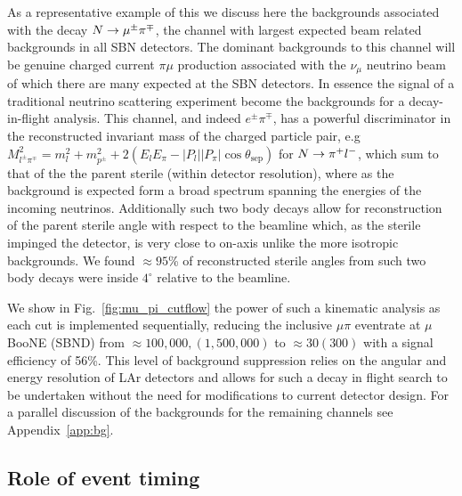 \documentclass[11pt, a4paper]{article}
\newcommand{\reffig}[1]{Fig.~\ref{#1}}
\newcommand{\refapp}[1]{Appendix~\ref{#1}}
\def\ster{\ensuremath N}
\begin{document}
As a representative example of this we discuss here the backgrounds associated
with the decay $\ster \rightarrow \mu^\pm \pi^\mp$, the channel with largest
expected beam related backgrounds in all SBN detectors. The dominant
backgrounds to this channel will be genuine charged current $\pi \mu$
production associated with the $\nu_\mu$ neutrino beam of which there are many
expected at the SBN detectors. In essence the signal of a traditional neutrino
scattering experiment become the backgrounds for a decay-in-flight analysis.
This channel, and indeed $e^\pm \pi^\mp$, has a powerful discriminator in the
reconstructed invariant mass of the charged particle pair, e.g  $M_{l^\pm
\pi^\mp}^2=m_l^2+m_{p^\pm}^2+ 2(E_l E_\pi - |P_l||P_\pi|\cos\theta_\text{sep})$
for $\ster\rightarrow \pi^+ l^-$, which sum to that of the the parent sterile
(within detector resolution), where as the background is expected form a broad
spectrum spanning the energies of the incoming neutrinos. Additionally such two
body decays allow for reconstruction of the parent sterile angle with respect
to the beamline which, as the sterile impinged the detector, is very close to
on-axis unlike the more isotropic backgrounds. We found $\approx 95$\% of
reconstructed sterile angles from such two body decays were inside $4^\circ$
relative to the beamline. 

We show in \reffig{fig:mu_pi_cutflow} the power of such a kinematic analysis as
each cut is implemented sequentially, reducing the inclusive $\mu \pi$
eventrate at $\mu$BooNE (SBND) from $\approx 100,000,(1,500,000)$ to $\approx
30 (300)$ with a signal efficiency of 56\%. This level of background suppression
relies on the angular and energy resolution of LAr detectors and allows for
such a decay in flight search to be undertaken without the need for
modifications to current detector design.  For a parallel discussion of the
backgrounds for the remaining channels see \refapp{app:bg}.

\subsection{\label{sec:timing}Role of event timing}
\end{document}
